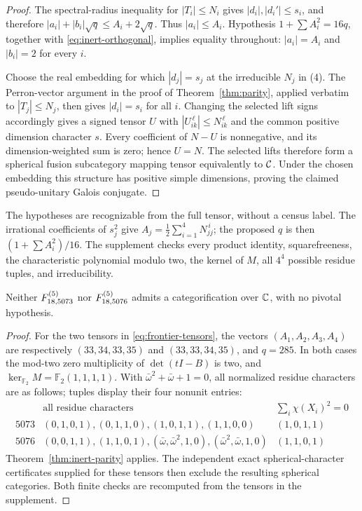\begin{proof}
The spectral-radius inequality for $|T_i|\le N_i$ gives
$|d_i|,|d_i'|\le s_i$, and therefore
$|a_i|+|b_i|\sqrt q\le A_i+2\sqrt q$.
Thus $|a_i|\le A_i$. Hypothesis $1+\sum A_i^2=16q$, together with
\eqref{eq:inert-orthogonal}, implies equality throughout:
$|a_i|=A_i$ and $|b_i|=2$ for every $i$.

Choose the real embedding for which $|d_j|=s_j$ at the irreducible
$N_j$ in (4). The Perron-vector argument in the proof of
Theorem~\ref{thm:parity}, applied verbatim to $|T_j|\le N_j$,
then gives $|d_i|=s_i$ for all $i$. Changing the selected lift signs
accordingly gives a signed tensor $U$ with $|U_{ik}^{\,\ell}|\le
N_{ik}^{\,\ell}$ and the common positive dimension character $s$.
Every coefficient of $N-U$ is nonnegative, and its dimension-weighted
sum is zero; hence $U=N$. The selected lifts therefore form a
spherical fusion subcategory mapping tensor equivalently to $\mathcal C$.
Under the chosen embedding this structure has positive simple
dimensions, proving the claimed pseudo-unitary Galois conjugate.
\end{proof}

The hypotheses are recognizable from the full tensor, without a
census label. The irrational coefficients of $s_j^2$ give
$A_j=\frac12\sum_{i=1}^4N_{jj}^{\,i}$; the proposed $q$ is then
$(1+\sum A_i^2)/16$. The supplement checks every product identity,
squarefreeness, the characteristic polynomial modulo two, the kernel
of $M$, all $4^4$ possible residue tuples, and irreducibility.

\begin{corollary}\label{cor:inert-frontier}
Neither $F^{(5)}_{18,5073}$ nor $F^{(5)}_{18,5076}$ admits a categorification
over $\mathbb C$, with no pivotal hypothesis.
\end{corollary}
\begin{proof}
For the two tensors in \eqref{eq:frontier-tensors}, the vectors
$(A_1,A_2,A_3,A_4)$ are respectively
$(33,34,33,35)$ and $(33,33,34,35)$, and $q=285$. In both cases the
mod-two zero multiplicity of $\det(tI-B)$ is two, and
$\ker_{\mathbb F_2}M=\mathbb F_2(1,1,1,1)$.
With $\bar\omega^2+\bar\omega+1=0$, all normalized residue characters
are as follows; tuples display their four nonunit entries:
\[
\begin{array}{c|l|l}
 &\text{all residue characters}&\sum_i\chi(X_i)^2=0\\ \hline
5073 &(0,1,0,1),(0,1,1,0),(1,0,1,1),(1,1,0,0)&(1,0,1,1)\\
5076 &(0,0,1,1),(1,1,0,1),(\bar\omega,\bar\omega^2,1,0),
 (\bar\omega^2,\bar\omega,1,0)&(1,1,0,1)
\end{array}
\]
Theorem~\ref{thm:inert-parity} applies. The independent exact
spherical-character certificates supplied for these tensors then
exclude the resulting spherical categories. Both finite checks are
recomputed from the tensors in the supplement.
\end{proof}
